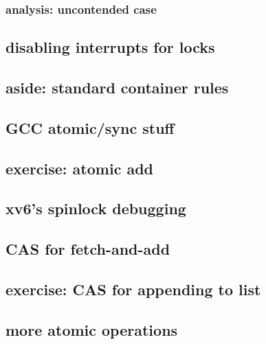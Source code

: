 \subsubsection{analysis: uncontended case}



\subsection{disabling interrupts for locks}


%

\subsection{aside: standard container rules}


\subsection{GCC atomic/sync stuff}


\subsection{exercise: atomic add}

\subsection{xv6's spinlock debugging}



\subsection{CAS for fetch-and-add}


\subsection{exercise: CAS for appending to list}



\subsection{more atomic operations}

